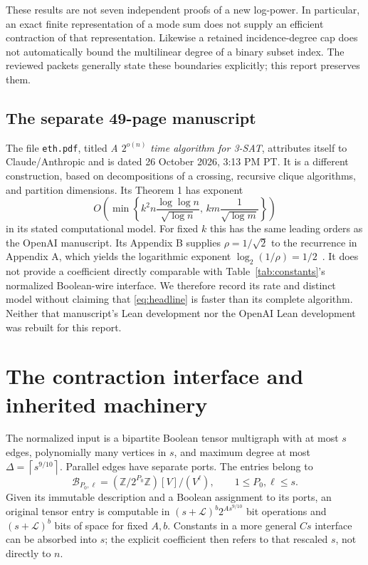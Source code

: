 \documentclass[11pt,letterpaper]{article}
\theoremstyle{definition}\newtheorem{definition}[theorem]{Definition}
\theoremstyle{remark}\newtheorem{remark}[theorem]{Remark}
\newcommand{\Z}{\mathbb Z}
\newcommand{\LL}{\mathcal L}
\newcommand{\ceil}[1]{\left\lceil#1\right\rceil}
\begin{document}
These results are not seven independent proofs of a new log-power. In
particular, an exact finite representation of a mode sum does not supply
an efficient contraction of that representation. Likewise a retained
incidence-degree cap does not automatically bound the multilinear degree
of a binary subset index. The reviewed packets generally state these
boundaries explicitly; this report preserves them.

\subsection{The separate 49-page manuscript}
The file \texttt{eth.pdf}, titled \emph{A $2^{o(n)}$ time algorithm for
3-SAT}, attributes itself to Claude/Anthropic and is dated 26 October 2026,
3:13 PM PT. It is a different construction, based on decompositions of a
crossing, recursive clique algorithms, and partition dimensions. Its
Theorem 1 has exponent
\[
 O\!\left(\min\left\{
  k^2n\frac{\log\log n}{\sqrt{\log n}},\,
  km\frac1{\sqrt{\log m}}
 \right\}\right)
\]
in its stated computational model. For fixed $k$ this has the same leading
orders as the OpenAI manuscript. Its Appendix B supplies
$\rho=1/\sqrt2$ to the recurrence in Appendix A, which yields the
logarithmic exponent $\log_2(1/\rho)=1/2$~\cite{otherpaper}.
It does not provide a coefficient directly comparable with
Table~\ref{tab:constants}'s normalized Boolean-wire interface. We therefore
record its rate and distinct model without claiming that
\eqref{eq:headline} is faster than its complete algorithm. Neither that
manuscript's Lean development nor the OpenAI Lean development was rebuilt
for this report.

\section{The contraction interface and inherited machinery}\label{sec:interface}
The normalized input is a bipartite Boolean tensor multigraph with at most
$s$ edges, polynomially many vertices in $s$, and maximum degree at most
$\Delta=\ceil{s^{9/10}}$. Parallel edges have separate ports. The entries
belong to
\[
 \mathcal B_{P_0,\ell}=(\Z/2^{P_0}\Z)[V]/(V^\ell),
 \qquad 1\le P_0,\ell\le s.
\]
Given its immutable description and a Boolean assignment to its ports,
an original tensor entry is computable in
$(s+\LL)^b2^{A s^{9/10}}$ bit operations and $(s+\LL)^b$ bits of
space for fixed $A,b$. Constants in a more general $Cs$ interface can be
absorbed into $s$; the explicit coefficient then refers to that rescaled
$s$, not directly to $n$.
\end{document}
